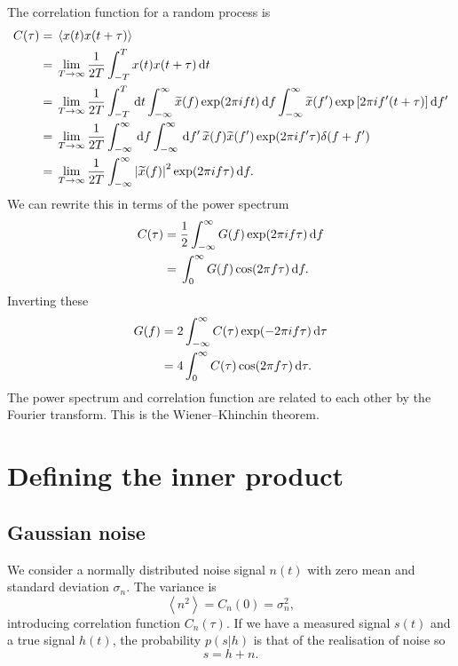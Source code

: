 The correlation function for a random process is
\begin{align}
C(\tau) = {} & \left\langle x(t)x(t + \tau)\right\rangle \\
 = {} & \lim_{T \rightarrow \infty} \frac{1}{2T} \int_{-T}^{T}{x(t)x(t + \tau)}\,\mathrm{d}{t} \nonumber \\
 = {} & \lim_{T \rightarrow \infty} \frac{1}{2T} \int_{-T}^{T}\,\mathrm{d} t \int_{-\infty}^{\infty}{\widetilde{x}(f)\exp(2\pi ift)}\,\mathrm{d}{f} \int_{-\infty}^{\infty}{\widetilde{x}(f')\exp\left[2\pi if'(t + \tau)\right]}\,\mathrm{d}{f'} \nonumber \\
 = {} & \lim_{T \rightarrow \infty} \frac{1}{2T} \int_{-\infty}^{\infty}\,\mathrm{d} f \int_{-\infty}^{\infty}\,\mathrm{d} f' \, \widetilde{x}(f)\widetilde{x}(f')\exp(2\pi if'\tau)\delta(f + f') \nonumber \\
 = {} & \lim_{T \rightarrow \infty} \frac{1}{2T} \int_{-\infty}^{\infty}{\left|\widetilde{x}(f)\right|^2\exp(2\pi if\tau)}\,\mathrm{d}{f}.
\end{align}
We can rewrite this in terms of the power spectrum
\begin{align}
C(\tau) = {} & \frac{1}{2} \int_{-\infty}^{\infty}{G(f)\exp(2\pi if\tau)}\,\mathrm{d}{f} \\
 = {} & \int_{0}^{\infty}{G(f)\cos(2\pi f\tau)}\,\mathrm{d}{f}.
\end{align}
Inverting these
\begin{align}
G(f) = {} & 2 \int_{-\infty}^{\infty}{C(\tau)\exp(-2\pi i f\tau)}\,\mathrm{d}{\tau} \\
 = {} & 4 \int_{0}^{\infty}{C(\tau) \cos(2\pi f\tau)}\,\mathrm{d}{\tau}.
\end{align}
The power spectrum and correlation function are related to each other by the Fourier transform. This is the Wiener--Khinchin theorem.

\section{Defining the inner product}

\subsection{Gaussian noise}

We consider a normally distributed noise signal $n(t)$ with zero mean and standard deviation $\sigma_n$. The variance is
\begin{equation}
\left\langle n^2 \right\rangle = C_n(0) = \sigma_n^2,
\end{equation}
introducing correlation function $C_n(\tau)$. If we have a measured signal $s(t)$ and a true signal $h(t)$, the probability $p(s|h)$ is that of the realisation of noise so
\begin{equation}
s = h + n.
\end{equation}

